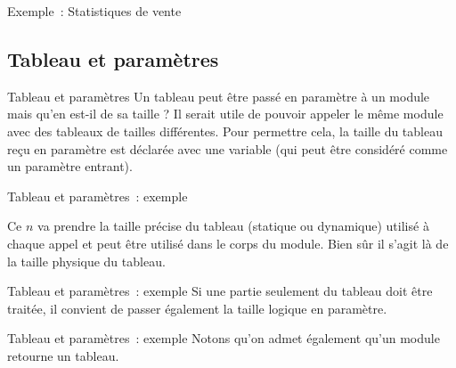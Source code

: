 \begin{frame}{Exemple~: Statistiques de vente}
\end{frame}

\subsection{Tableau et paramètres}

\begin{frame}{Tableau et paramètres}
	Un tableau peut être passé en paramètre à un module mais qu’en est-il de
	sa taille ? Il serait utile de pouvoir appeler le même module avec des
	tableaux de tailles différentes. Pour permettre cela, la taille du
	tableau reçu en paramètre est déclarée avec une variable (qui peut être
	considéré comme un paramètre entrant).
\end{frame}

\begin{frame}{Tableau et paramètres~: exemple}
	
	\bigskip

	Ce $n$ va prendre la taille précise du tableau
	(statique ou dynamique) utilisé à chaque appel et peut être utilisé
	dans le corps du module. Bien sûr il s’agit là de la taille physique du
	tableau.
\end{frame}

\begin{frame}{Tableau et paramètres~: exemple}
	Si une partie seulement du tableau doit être traitée, il
	convient de passer également la taille logique en paramètre.
	
\end{frame}

\begin{frame}{Tableau et paramètres~: exemple}
	Notons qu’on admet également qu’un module retourne un tableau. 
	
	\bigskip
	
\end{frame}


